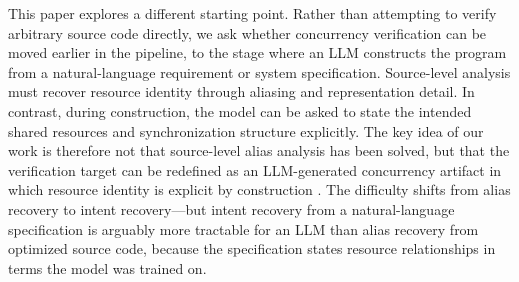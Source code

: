 This paper explores a different starting point. Rather than attempting to verify arbitrary source code directly, we ask whether concurrency verification can be moved earlier in the pipeline, to the stage where an LLM constructs the program from a natural-language requirement or system specification. Source-level analysis must recover resource identity through aliasing and representation detail. In contrast, during construction, the model can be asked to state the intended shared resources and synchronization structure explicitly. The key idea of our work is therefore not that source-level alias analysis has been solved, but that the verification target can be redefined as an LLM-generated concurrency artifact in which resource identity is explicit by construction \cite{Chen2021CodeLLMs,Fan2023RepairFromLLMs,Xia2023APRLLMs}. The difficulty shifts from alias recovery to intent recovery—but intent recovery from a natural-language specification is arguably more tractable for an LLM than alias recovery from optimized source code, because the specification states resource relationships in terms the model was trained on. 

